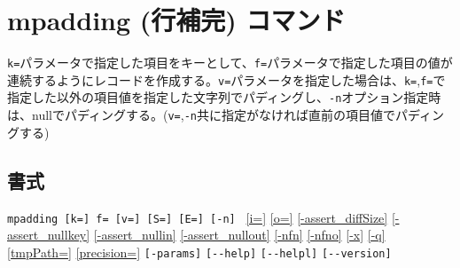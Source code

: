 
%

\section{mpadding (行補完) コマンド\label{sect:mpadding}}
\verb|k=|パラメータで指定した項目をキーとして、\verb|f=|パラメータで指定した項目の値が連続するようにレコードを作成する。\verb|v=|パラメータを指定した場合は、\verb|k=|,\verb|f=|で指定した以外の項目値を指定した文字列でパディングし、\verb|-n|オプション指定時は、nullでパディングする。(\verb|v=|,\verb|-n|共に指定がなければ直前の項目値でパディングする)

\subsection*{書式}
\verb|mpadding [k=] f= [v=] [S=] [E=] [-n] | 
\hyperref[sect:option_i]{[i=]}
\hyperref[sect:option_o]{[o=]}
\hyperref[sect:option_assert_diffSize]{[-assert\_diffSize]}
\hyperref[sect:option_assert_nullkey]{[-assert\_nullkey]}
\hyperref[sect:option_assert_nullin]{[-assert\_nullin]}
\hyperref[sect:option_assert_nullout]{[-assert\_nullout]}
\hyperref[sect:option_nfn]{[-nfn]} 
\hyperref[sect:option_nfno]{[-nfno]}  
\hyperref[sect:option_x]{[-x]}
\hyperref[sect:option_x]{[-q]}
\hyperref[sect:option_option_tmppath]{[tmpPath=]}
\hyperref[sect:option_precision]{[precision=]}
\verb|[-params]|
\verb|[--help]|
\verb|[--helpl]|
\verb|[--version]|\\

